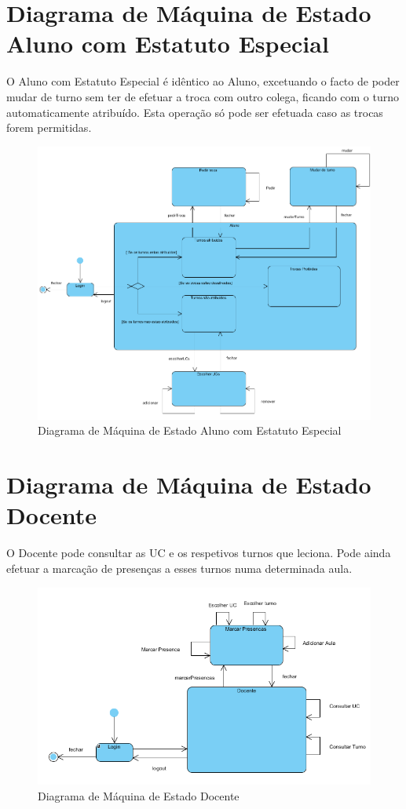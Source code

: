 \documentclass[12pt,a4paper]{report}
\begin{document}
\section{Diagrama de Máquina de Estado Aluno com Estatuto Especial}  
    O Aluno com Estatuto Especial é idêntico ao Aluno, excetuando o facto de poder mudar de turno sem ter de efetuar a troca com outro colega, ficando com o turno automaticamente atribuído. Esta operação só pode ser efetuada caso as trocas forem permitidas.   
       
    \begin{figure}[H]
    	\centering 
    	\includegraphics[width=\textwidth]{modelacao/diagramas_maq_estado/alunoE_maq_estado.png}  
    	\caption{Diagrama de Máquina de Estado Aluno com Estatuto Especial}
    \end{figure}

\pagebreak
\section{Diagrama de Máquina de Estado Docente}
    O Docente pode consultar as UC e os respetivos turnos que leciona. Pode ainda efetuar a marcação de presenças a esses turnos numa determinada aula.
   
    \begin{figure}[H]
	\centering 
	\includegraphics[width=\textwidth]{modelacao/diagramas_maq_estado/docente_maq_estado.png}  
	\caption{Diagrama de Máquina de Estado Docente}
    \end{figure}
\end{document}
